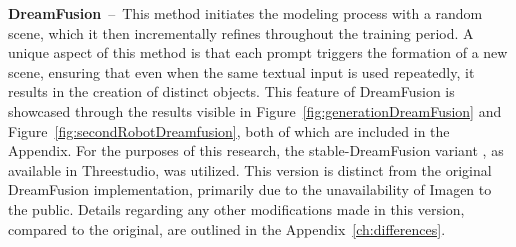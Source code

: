 \textbf{DreamFusion}~--~This method initiates the modeling process with a random scene, which it then incrementally refines throughout the training period. A unique aspect of this method is that each prompt triggers the formation of a new scene, ensuring that even when the same textual input is used repeatedly, it results in the creation of distinct objects. This feature of DreamFusion is showcased through the results visible in Figure~\ref{fig:generationDreamFusion} and Figure~\ref{fig:secondRobotDreamfusion}, both of which are included in the Appendix.
For the purposes of this research, the stable-DreamFusion variant \citep{stable-dreamfusion}, as available in Threestudio, was utilized. This version is distinct from the original DreamFusion implementation, primarily due to the unavailability of Imagen to the public. Details regarding any other modifications made in this version, compared to the original, are outlined in the Appendix~\ref{ch:differences}. 

